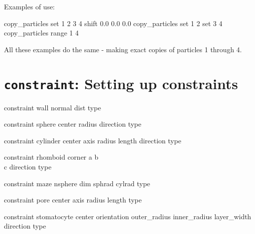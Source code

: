 Examples of use:\\
\begin{tclcode}
  copy_particles set {1 2 3 4} shift 0.0 0.0 0.0
  copy_particles set {1 2} set {3 4}
  copy_particles range 1 4
\end{tclcode}
All these examples do the same - making exact copies of particles 1 through 4.

\section{\texttt{constraint}: Setting up constraints}\label{sec:constraint}

\begin{essyntax}
  constraint wall normal    
  dist  type    
  
  constraint sphere center    
  radius  direction  type   
  
  constraint cylinder center    
  axis    
  radius  length  
  direction  
  type    
  
  constraint rhomboid corner    
  a    
  b    \\
  c    
  direction  
  type    
  
  constraint maze nsphere  
  dim  sphrad  cylrad 
  type  
  
  constraint pore center    
  axis    
  radius  length  
  type  

  constraint stomatocyte center    orientation   
  outer_radius  inner_radius  layer_width  direction  
  type   
  
  

\end{essyntax}
